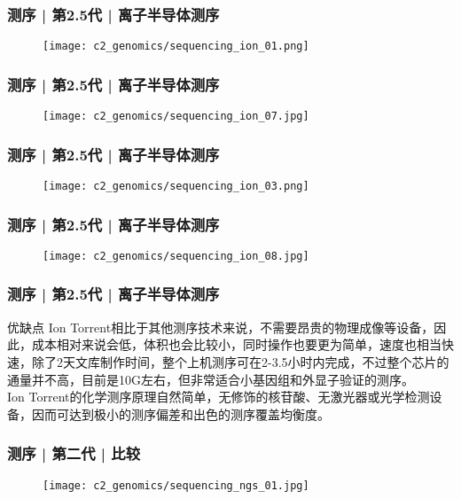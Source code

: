 \begin{frame}
  \frametitle{测序 | 第2.5代 | 离子半导体测序}
  \begin{figure}
    \centering
    \texttt{[image: c2\_genomics/sequencing\_ion\_01.png]}
  \end{figure}
\end{frame}

\begin{frame}
  \frametitle{测序 | 第2.5代 | 离子半导体测序}
  \begin{figure}
    \centering
    \texttt{[image: c2\_genomics/sequencing\_ion\_07.jpg]}
  \end{figure}
\end{frame}

\begin{frame}
  \frametitle{测序 | 第2.5代 | 离子半导体测序}
  \begin{figure}
    \centering
    \texttt{[image: c2\_genomics/sequencing\_ion\_03.png]}
  \end{figure}
\end{frame}

\begin{frame}
  \frametitle{测序 | 第2.5代 | 离子半导体测序}
  \begin{figure}
    \centering
    \texttt{[image: c2\_genomics/sequencing\_ion\_08.jpg]}
  \end{figure}
\end{frame}

\begin{frame}
  \frametitle{测序 | 第2.5代 | 离子半导体测序}
  \begin{block}{优缺点}
Ion Torrent相比于其他测序技术来说，不需要昂贵的物理成像等设备，因此，成本相对来说会低，体积也会比较小，同时操作也要更为简单，速度也相当快速，除了2天文库制作时间，整个上机测序可在2-3.5小时内完成，不过整个芯片的通量并不高，目前是10G左右，但非常适合小基因组和外显子验证的测序。\\
\vspace{1em}
Ion Torrent的化学测序原理自然简单，无修饰的核苷酸、无激光器或光学检测设备，因而可达到极小的测序偏差和出色的测序覆盖均衡度。
  \end{block}
\end{frame}

\begin{frame}
  \frametitle{测序 | 第二代 | \alert{比较}}
  \begin{figure}
    \centering
    \texttt{[image: c2\_genomics/sequencing\_ngs\_01.jpg]}
  \end{figure}
\end{frame}

